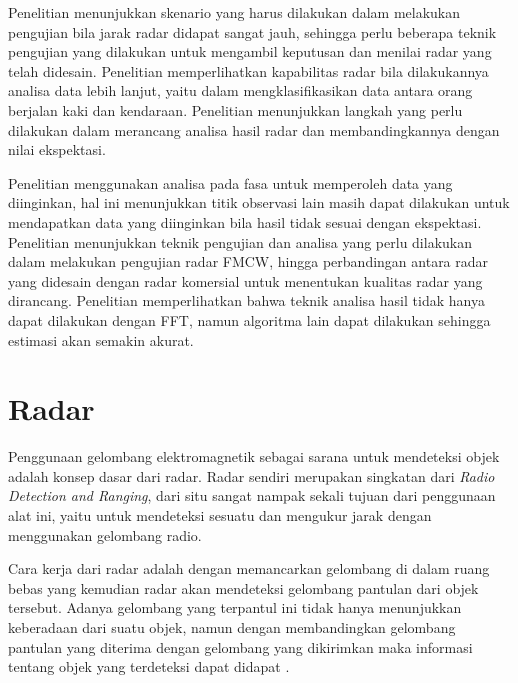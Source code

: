 Penelitian \cite{Dabrowski2020} menunjukkan skenario yang harus dilakukan dalam melakukan pengujian bila jarak radar didapat sangat jauh, sehingga perlu beberapa teknik pengujian yang dilakukan untuk mengambil keputusan dan menilai radar yang telah didesain. Penelitian \cite{Rizik2020} memperlihatkan kapabilitas radar bila dilakukannya analisa data lebih lanjut, yaitu dalam mengklasifikasikan data antara orang berjalan kaki dan kendaraan. Penelitian \cite{Jeong2021} menunjukkan langkah yang perlu dilakukan dalam merancang analisa hasil radar dan membandingkannya dengan nilai ekspektasi.

Penelitian \cite{Pramudita2020} menggunakan analisa pada fasa untuk memperoleh data yang diinginkan, hal ini menunjukkan titik observasi lain masih dapat dilakukan untuk mendapatkan data yang diinginkan bila hasil tidak sesuai dengan ekspektasi. Penelitian \cite{Pramudita2023} menunjukkan teknik pengujian dan analisa yang perlu dilakukan dalam melakukan pengujian radar FMCW, hingga perbandingan antara radar yang didesain dengan radar komersial untuk menentukan kualitas radar yang dirancang. Penelitian \cite{Zhou2023} memperlihatkan bahwa teknik analisa hasil tidak hanya dapat dilakukan dengan FFT, namun algoritma lain dapat dilakukan sehingga estimasi akan semakin akurat.


\section{Radar}

Penggunaan gelombang elektromagnetik sebagai sarana untuk mendeteksi objek adalah konsep dasar dari radar. Radar sendiri merupakan singkatan dari \textit{Radio Detection and Ranging}, dari situ sangat nampak sekali tujuan dari penggunaan alat ini, yaitu untuk mendeteksi sesuatu dan mengukur jarak dengan menggunakan gelombang radio. 

Cara kerja dari radar adalah dengan memancarkan gelombang di dalam ruang bebas yang kemudian radar akan mendeteksi gelombang pantulan dari objek tersebut. Adanya gelombang yang terpantul ini tidak hanya menunjukkan keberadaan dari suatu objek, namun dengan membandingkan gelombang pantulan yang diterima dengan gelombang yang dikirimkan maka informasi tentang objek yang terdeteksi dapat didapat \cite{Skolnik2001}.

